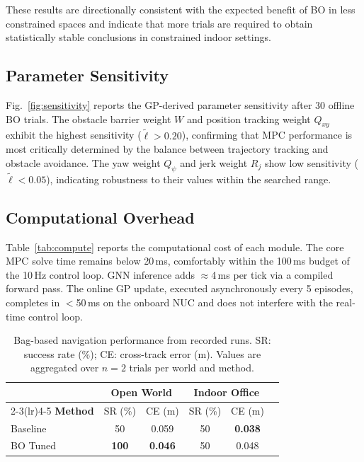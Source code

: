 \documentclass[conference]{IEEEtran}
\begin{document}
These results are directionally consistent with the expected benefit of BO in less constrained spaces and indicate that more trials are required to obtain statistically stable conclusions in constrained indoor settings.

\subsection{Parameter Sensitivity}

Fig.~\ref{fig:sensitivity} reports the GP-derived parameter sensitivity after 30 offline BO trials. The obstacle barrier weight $W$ and position tracking weight $Q_{xy}$ exhibit the highest sensitivity ($\tilde{\ell} > 0.20$), confirming that MPC performance is most critically determined by the balance between trajectory tracking and obstacle avoidance. The yaw weight $Q_\psi$ and jerk weight $R_j$ show low sensitivity ($\tilde{\ell} < 0.05$), indicating robustness to their values within the searched range.

\subsection{Computational Overhead}

Table~\ref{tab:compute} reports the computational cost of each module. The core MPC solve time remains below 20\,ms, comfortably within the 100\,ms budget of the 10\,Hz control loop. GNN inference adds $\approx$4\,ms per tick via a compiled forward pass. The online GP update, executed asynchronously every 5 episodes, completes in $<$50\,ms on the onboard NUC and does not interfere with the real-time control loop.

\begin{table}[t]
	\centering
	\caption{Bag-based navigation performance from recorded runs. SR: success rate (\%); CE: cross-track error (m). Values are aggregated over $n=2$ trials per world and method.}
	\label{tab:main}
	\renewcommand{\arraystretch}{1.15}
	\begin{tabular}{lccccc}
		\toprule
		                         & \multicolumn{2}{c}{\textbf{Open World}} & \multicolumn{2}{c}{\textbf{Indoor Office}} \\
		\cmidrule(lr){2-3}\cmidrule(lr){4-5}
		\textbf{Method}          & SR (\%)                                 & CE (m)                                     & SR (\%)                                     & CE (m)            \\
		\midrule
		Baseline                 & 50                                      & 0.059                                      & 50                                          & \textbf{0.038} \\
		BO Tuned                 & \textbf{100}                            & \textbf{0.046}                             & 50                                          & 0.048 \\
		\bottomrule
	\end{tabular}
\end{table}
\end{document}
